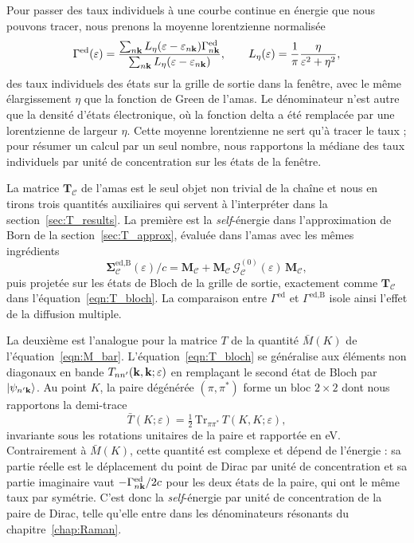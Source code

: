 Pour passer des taux individuels à une courbe continue en énergie que nous pouvons tracer, nous prenons la moyenne lorentzienne normalisée
\begin{equation}
    \Gamma^\text{ed}(\varepsilon) = \frac{\sum_{n\mathbf{k}}L_\eta(\varepsilon-\varepsilon_{n\mathbf{k}})\Gamma^\text{ed}_{n\mathbf{k}}}{\sum_{n\mathbf{k}} L_\eta(\varepsilon-\varepsilon_{n\mathbf{k}})},\qquad L_\eta(\varepsilon) = \frac{1}{\pi}\frac{\eta}{\varepsilon^2+\eta^2},\label{eqn:moyenne_lorentzienne}
\end{equation}
des taux individuels des états sur la grille de sortie dans la fenêtre, avec le même élargissement $\eta$ que la fonction de Green de l'amas. Le dénominateur n'est autre que la densité d'états électronique, où la fonction delta a été remplacée par une lorentzienne de largeur $\eta$. Cette moyenne lorentzienne ne sert qu'à tracer le taux ; pour résumer un calcul par un seul nombre, nous rapportons la médiane des taux individuels par unité de concentration sur les états de la fenêtre.

\bigskip
{}

La matrice $\bm T_\mathcal{C}$ de l'amas est le seul objet non trivial de la chaîne et nous en tirons trois quantités auxiliaires qui servent à l'interpréter dans la section~\ref{sec:T_results}. La première est la \textit{self}-énergie dans l'approximation de Born de la section~\ref{sec:T_approx}, évaluée dans l'amas avec les mêmes ingrédients
\begin{equation}
    \bm\Sigma^{\text{ed},\text{B}}_\mathcal{C}(\varepsilon)/c = \bm M_\mathcal{C} + \bm M_\mathcal{C}\,\bm{\mathcal{G}}^{(0)}_\mathcal{C}(\varepsilon)\,\bm M_\mathcal{C},\label{eqn:born_amas}
\end{equation}
puis projetée sur les états de Bloch de la grille de sortie, exactement comme $\bm T_\mathcal{C}$ dans l'équation~\eqref{eqn:T_bloch}. La comparaison entre $\Gamma^\text{ed}$ et $\Gamma^\text{ed,B}$ isole ainsi l'effet de la diffusion multiple.

La deuxième est l'analogue pour la matrice $T$ de la quantité $\bar M(K)$ de l'équation~\eqref{eqn:M_bar}. L'équation~\eqref{eqn:T_bloch} se généralise aux éléments non diagonaux en bande $T_{nn'}(\mathbf{k},\mathbf{k};\varepsilon)$ en remplaçant le second état de Bloch par $\ket{\psi_{n'\mathbf{k}}}$. Au point $K$, la paire dégénérée $(\pi,\pi^*)$ forme un bloc $2\times 2$ dont nous rapportons la demi-trace
\begin{equation}
    \bar T(K;\varepsilon) = \tfrac{1}{2}\,\mathrm{Tr}_{\pi\pi^*}\,T(K,K;\varepsilon),\label{eqn:T_bar}
\end{equation}
invariante sous les rotations unitaires de la paire et rapportée en eV. Contrairement à $\bar M(K)$, cette quantité est complexe et dépend de l'énergie : sa partie réelle est le déplacement du point de Dirac par unité de concentration et sa partie imaginaire vaut $-\Gamma^\text{ed}_{n\mathbf{k}}/2c$ pour les deux états de la paire, qui ont le même taux par symétrie. C'est donc la \textit{self}-énergie par unité de concentration de la paire de Dirac, telle qu'elle entre dans les dénominateurs résonants du chapitre~\ref{chap:Raman}.

